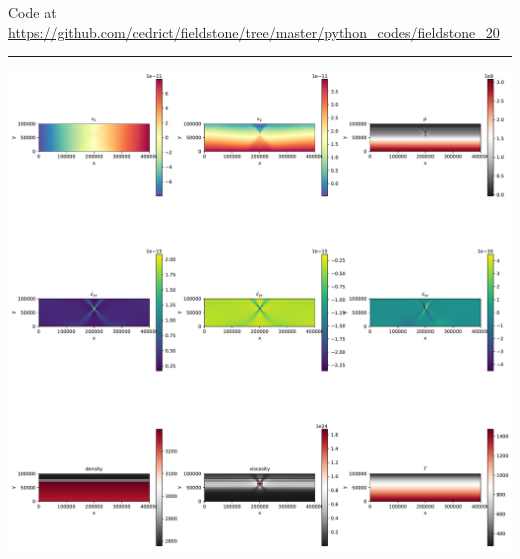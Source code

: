 

\begin{center}
Code at \url{https://github.com/cedrict/fieldstone/tree/master/python_codes/fieldstone_20}
\end{center}

\par\noindent\rule{\textwidth}{0.4pt}


\includegraphics[width=16cm]{python_codes/fieldstone_50/images/solution.pdf}

